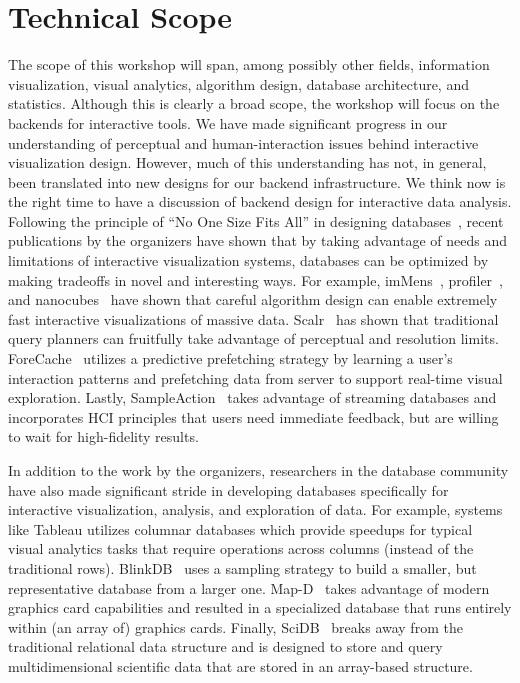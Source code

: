\documentclass[journal]{vgtc}                %
\begin{document}
\section{Technical Scope}
The scope of this workshop will span, among possibly other fields,
information visualization, visual analytics, algorithm design,
database architecture, and statistics. Although this is clearly a
broad scope, the workshop will focus on the backends for interactive
tools. We have made significant progress in our understanding of
perceptual and human-interaction issues behind interactive
visualization design. However, much of this understanding has not, in
general, been translated into new designs for our backend
infrastructure. We think now is the right time to have a discussion of
backend design for interactive data analysis. Following the principle
of ``No One Size Fits All'' in designing databases~, recent
publications by the organizers have shown that by taking advantage of
needs and limitations of interactive visualization systems, databases
can be optimized by making tradeoffs in novel and interesting
ways. For example, imMens~, profiler~, and nanocubes~ have
shown that careful algorithm design can enable extremely fast
interactive visualizations of massive data. Scalr~ has shown that
traditional query planners can fruitfully take advantage of perceptual
and resolution limits. ForeCache~ utilizes a predictive prefetching
strategy by learning a user’s interaction patterns and prefetching
data from server to support real-time visual exploration. Lastly,
SampleAction~ takes advantage of streaming databases and
incorporates HCI principles that users need immediate feedback, but
are willing to wait for high-fidelity results.


In addition to the work by the organizers, researchers in the database
community have also made significant stride in developing databases
specifically for interactive visualization, analysis, and exploration
of data. For example, systems like Tableau utilizes columnar databases
which provide speedups for typical visual analytics tasks that require
operations across columns (instead of the traditional rows). BlinkDB~
uses a sampling strategy to build a smaller, but representative
database from a larger one. Map-D~ takes advantage of modern
graphics card capabilities and resulted in a specialized database that
runs entirely within (an array of) graphics cards. Finally, SciDB~
breaks away from the traditional relational data structure and is
designed to store and query multidimensional scientific data that are
stored in an array-based structure.
\end{document}
